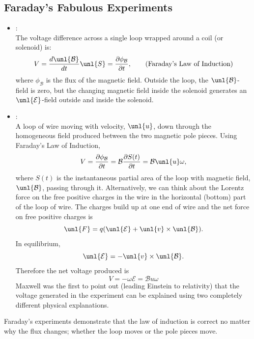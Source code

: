 \documentclass[a4paper, 11pt, normalem]{report}
\newcommand\p{\partial}
\newcommand\E{\mathcal{E}}
\newcommand\uE{\unl{\E}}
\newcommand\B{\mathcal{B}}
\newcommand\uB{\unl{\B}}
\begin{document}
\subsection{Faraday's Fabulous Experiments}
\begin{itemize}
    \item {}: \\
    The voltage difference across a single loop wrapped around a coil (or solenoid) is:
    \begin{equation}
        V = \frac{d\uB}{dt}\unl{S} = \frac{\p \phi_{\B}}{\p t}, \tag{Faraday's Law of Induction}
    \end{equation}
    where $\phi_\B$ is the flux of the magnetic field.
    Outside the loop, the $\uB$-field is zero, but the changing magnetic field inside the solenoid generates an $\uE$-field outside and inside the solenoid.
    \item {}: \\
    A loop of wire moving with velocity, $\unl{u}$, down through the homogeneous field produced between the two magnetic pole pieces.
    Using Faraday's Law of Induction,
    \begin{equation*}
        V = \frac{\p \phi_{\B}}{\p t} = \B\frac{\p S(t)}{\p t} = \B\unl{u}\omega,
    \end{equation*}
    where $S(t)$ is the instantaneous partial area of the loop with magnetic field, $\uB$, passing through it.
    Alternatively, we can think about the Lorentz force on the free positive charges in the wire in the horizontal (bottom) part of the loop of wire.
    The charges build up at one end of wire and the net force on free positive charges is
    \begin{equation*}
        \unl{F} = q(\uE + \unl{v}\times\uB).
    \end{equation*}
    In equilibrium,
    \begin{equation*}
        \uE = -\unl{v}\times\uB.
    \end{equation*}
    Therefore the net voltage produced is
    \begin{equation*}
        V = -\omega \E = \B u \omega
    \end{equation*}
    Maxwell was the first to point out (leading Einstein to relativity) that the voltage generated in the experiment can be explained using two completely different physical explanations.
\end{itemize}
Faraday's experiments demonstrate that the law of induction is correct no matter why the flux changes; whether the loop moves or the pole pieces move.
\end{document}
